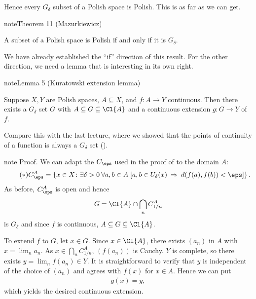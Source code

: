 \documentclass[letterpaper,10pt,english]{jupyterBook}
\begin{document}
\sphinxAtStartPar
Hence every \(G_\delta\) subset of a Polish space is Polish. This is as far as we can get.
\label{subsets_Polish:thm-subsets-Polish}
\begin{sphinxadmonition}{note}{Theorem 11 (Mazurkiewicz)}



\sphinxAtStartPar
A subset of a Polish space is Polish if and only if it is \(G_\delta\).
\end{sphinxadmonition}

\sphinxAtStartPar
We have already established the “if” direction of this result.
For the other direction, we need a lemma that is interesting in its own right.
\label{subsets_Polish:lemma-Kuratowski-extension}
\begin{sphinxadmonition}{note}{Lemma 5 (Kuratowski extension lemma)}



\sphinxAtStartPar
Suppose \(X, Y\) are Polish spaces, \(A \subseteq X\), and \(f: A \to Y\) continuous. Then there exists a \(G_\delta\) set \(G\) with \(A \subseteq G \subseteq \Cl{A}\) and a continuous extension \(g : G \to Y\) of \(f\).
\end{sphinxadmonition}

\sphinxAtStartPar
Compare this with the last lecture, where we showed that the points of continuity of a function is always a \(G_\delta\) set ({\hyperref[\detokenize{Borel:thm-Young}]{}}).

\begin{sphinxadmonition}{note}
\sphinxAtStartPar
Proof. We can adapt the  \(C_\eps\) used in the proof of {\hyperref[\detokenize{Borel:thm-Young}]{}} to the domain \(A\):
\begin{equation*} \tag{$*$}
    C^A_\eps = \left \{ x \in X \colon \exists \delta > 0 \: \forall a,b \in A \; [ a,b \in U_\delta(x) \: \Rightarrow \: d(f(a),f(b)) < \eps  ] \right \}.
\end{equation*}
\sphinxAtStartPar
As before, \(C^A_\eps\) is open and hence
\begin{equation*}
\begin{split}
G = \Cl{A} \cap \bigcap_n C^A_{1/n}
\end{split}
\end{equation*}
\sphinxAtStartPar
is \(G_\delta\) and since \(f\) is continuous, \(A \subseteq G \subseteq \Cl{A}\).

\sphinxAtStartPar
To extend \(f\) to \(G\), let \(x \in G\). Since \(x \in \Cl{A}\), there exists \((a_n)\) in \(A\) with \(x = \lim_n a_n\). As \(x \in \bigcap_n C^A_{1/n}\), \((f(a_n))\) is Cauchy. \(Y\) is complete, so there exists \(y = \lim_n f(a_n) \in Y\). It is straightforward to verify that \(y\) is independent of the choice of \((a_n)\) and agrees with \(f(x)\) for \(x \in A\). Hence we can put
\begin{equation*}
\begin{split}
g(x) = y,
\end{split}
\end{equation*}
\sphinxAtStartPar
which yields the desired continuous extension.
\end{sphinxadmonition}
\end{document}
